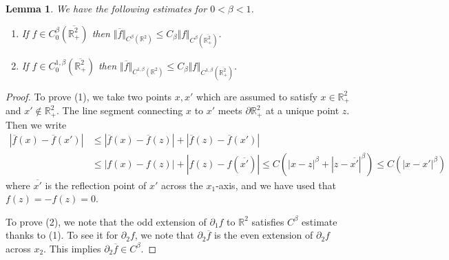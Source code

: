 \documentclass[10pt]{amsart}
\newtheorem{lemma}[theorem]{Lemma}
\theoremstyle{definition}
\theoremstyle{remark}
\numberwithin{equation}{section}
\newcommand{\nrm}[1]{\Vert#1\Vert}
\newcommand{\rd}{\partial}
\newcommand{\0}{\emptyset}
\newcommand{\ohp}{\overline{\bbR^2_+}}
\newcommand{\bt}{\beta}
\newcommand{\bbR}{\mathbb R}
\begin{document}
	\begin{lemma}\label{lem:Holder}
		We have the following estimates for $0<\bt<1$. 
		\begin{enumerate}
			\item If $f \in C^\bt_0(\ohp)$ then $\nrm{\overline{f}}_{C^{\bt}(\bbR^2)} \le C_\bt \nrm{f}_{C^\bt(\ohp)}$. 
			\item If $f \in C^{1,\bt}_0(\ohp)$ then $\nrm{\overline{f}}_{C^{1,\bt}(\bbR^2)} \le C_\bt \nrm{f}_{C^{1,\bt}(\ohp)}$. 
		\end{enumerate}
	\end{lemma}
	\begin{proof}
		To prove (1), we take two points $x, x'$ which are assumed to satisfy $x \in \bbR^2_+$ and $x' \notin \bbR^2_+$. The line segment connecting $x$ to $x'$ meets $\partial\bbR^2_+$ at a unique point $z$. Then we write \begin{equation*}
			\begin{split}
				|\overline{f}(x) - \overline{f}(x')| &\le |\overline{f}(x) - \overline{f}(z)| + |\overline{f}(z) - \overline{f}(x')| \\
				& \le |f(x)-f(z)| + |f(z)-f(\overline{x'})| \le C(|x-z|^\bt + |z-\overline{x'}|^\bt) \le C(|x-x'|^\bt)
			\end{split}
		\end{equation*} where $\overline{x'}$ is the reflection point of $x'$ across the $x_1$-axis, and we have used that $f(z)=-f(z)=0$. 
		
		
		To prove (2), we note that the odd extension of $\rd_1f$ to $\bbR^2$ satisfies $C^\bt$ estimate thanks to (1). To see it for $\rd_2f$, we note that $\rd_2 \overline{f}$ is the even extension of $\rd_2 f$ across $x_2$. This implies $\rd_2\overline{f} \in C^{\bt}$. 
		
		
	\end{proof}
	
	
	
\end{document}
